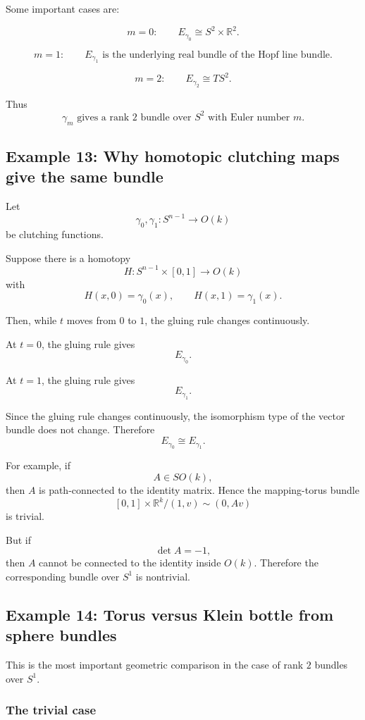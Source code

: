 \documentclass[12pt,a4paper]{article}
\theoremstyle{notespace}
\begin{document}
Some important cases are:

\[
m=0:
\qquad
E_{\gamma_0}\cong S^2\times \mathbb{R}^2.
\]

\[
m=1:
\qquad
E_{\gamma_1}
\text{ is the underlying real bundle of the Hopf line bundle.}
\]

\[
m=2:
\qquad
E_{\gamma_2}\cong TS^2.
\]

Thus
\[
\boxed{
	\gamma_m\text{ gives a rank }2\text{ bundle over }S^2
	\text{ with Euler number }m.
}
\]

\subsection{Example 13: Why homotopic clutching maps give the same bundle}

Let
\[
\gamma_0,\gamma_1:S^{n-1}\to O(k)
\]
be clutching functions.

Suppose there is a homotopy
\[
H:S^{n-1}\times [0,1]\to O(k)
\]
with
\[
H(x,0)=\gamma_0(x),
\qquad
H(x,1)=\gamma_1(x).
\]

Then, while \(t\) moves from \(0\) to \(1\), the gluing rule changes continuously.

At \(t=0\), the gluing rule gives
\[
E_{\gamma_0}.
\]

At \(t=1\), the gluing rule gives
\[
E_{\gamma_1}.
\]

Since the gluing rule changes continuously, the isomorphism type of the vector bundle does not change. Therefore
\[
E_{\gamma_0}\cong E_{\gamma_1}.
\]

For example, if
\[
A\in SO(k),
\]
then \(A\) is path-connected to the identity matrix. Hence the mapping-torus bundle
\[
[0,1]\times \mathbb{R}^k/(1,v)\sim(0,Av)
\]
is trivial.

But if
\[
\det A=-1,
\]
then \(A\) cannot be connected to the identity inside \(O(k)\). Therefore the corresponding bundle over \(S^1\) is nontrivial.

\subsection{Example 14: Torus versus Klein bottle from sphere bundles}

This is the most important geometric comparison in the case of rank \(2\) bundles over \(S^1\).

\subsubsection*{The trivial case}
\end{document}
